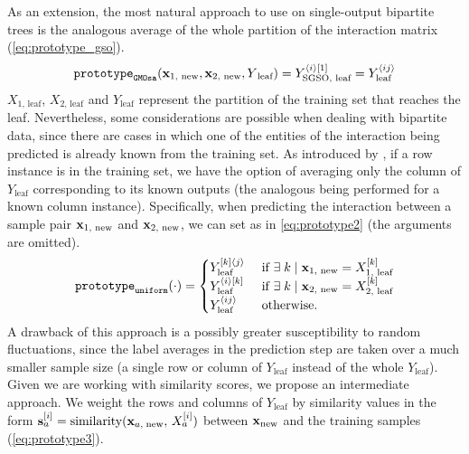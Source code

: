 As an extension, the most natural approach to use on single-output bipartite trees is the analogous average of the whole partition of the interaction matrix (\autoref{eq:prototype_gso}).
%
%
%
\begin{equation}
    \texttt{prototype}_\texttt{GMOsa}(\mathbf{x}_\text{1, new}, \mathbf{x}_\text{2, new}, Y\textsubscript{leaf})
        = Y_\text{SGSO, leaf}^{\langle i\rangle[1]}
        = Y_\text{leaf}^{\langle ij\rangle}
    \label{eq:prototype_gso}
\end{equation}
%
$X_\text{1, leaf}$, $X_\text{2, leaf}$ and $Y_\text{leaf}$ represent the partition of the training set that reaches the leaf.
%
Nevertheless, some considerations are possible when dealing with bipartite data, since there are cases in which one of the entities of the interaction being predicted is already known from the training set. As introduced by \cite{pliakos2018global}, if a row instance is in the training set, we have the option of averaging only the column of $Y_\text{leaf}$ corresponding to its known outputs (the analogous being performed for a known column instance). Specifically, when predicting the interaction between a sample pair $\mathbf{x}_{1\text{, new}}$ and $\mathbf{x}_{2\text{, new}}$, we can set \prototype{} as in \autoref{eq:prototype2} (the arguments are omitted).
\begin{equation}
    \texttt{prototype}_\texttt{uniform}(\cdot)
    = \begin{cases}
        Y_\text{leaf}^{[k]\langle j\rangle} & \text{ if }
            \exists \; k \mid \mathbf{x}_{1\text{, new}} = X_{1\text{, leaf}}^{[k]}\\
        Y_\text{leaf}^{\langle i\rangle[k]} & \text{ if }
            \exists \; k \mid \mathbf{x}_{2\text{, new}} = X_{2\text{, leaf}}^{[k]}\\
        Y_\text{leaf}^{\langle ij \rangle} & \text{ otherwise.}
    \end{cases}
    \label{eq:prototype2}
\end{equation}
A drawback of this approach is a possibly greater susceptibility to random fluctuations, since the label averages in the prediction step are taken over a much smaller sample size (a single row or column of $Y_\text{leaf}$ instead of the whole $Y_\text{leaf}$). 
Given we are working with similarity scores, we propose an intermediate approach. We weight the rows and columns of $Y_\text{leaf}$ by similarity values in the form $\mathbf{s}_a^{[i]} = \text{similarity}(\mathbf{x}_{a,\;\text{new}}, \, X_a^{[i]})$ between $\mathbf{x}_\text{new}$ and the training samples (\autoref{eq:prototype3}).

